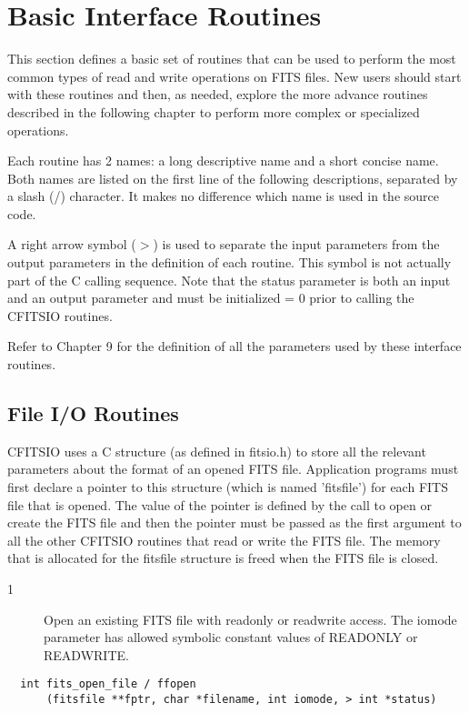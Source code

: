 
\chapter{ Basic Interface Routines }

This section defines a basic set of routines that can be
used to perform the most common types of read and write operations
on FITS files.  New users should start with these routines and
then, as needed, explore the more advance routines described in
the following chapter to perform more complex or specialized operations.

Each routine has 2 names: a long descriptive
name and a short concise name.  Both names are listed on the first
line of the following descriptions, separated by a slash (/) character.
It makes no difference which name is used in the source code.

A right arrow symbol ($>$) is used to separate the input parameters from
the output parameters in the  definition of each routine.  This symbol
is not actually part of the C calling sequence.  Note that
the status parameter is both an input and an output parameter
and must be initialized = 0 prior to calling the CFITSIO routines.

Refer to Chapter 9 for the definition of all the parameters
used by these interface routines.


\section{File I/O Routines}

CFITSIO uses a C structure (as defined in fitsio.h) to store all the
relevant parameters about the format of an opened FITS file.
Application programs must first declare a pointer to this structure
(which is named 'fitsfile') for each FITS file that is opened.  The
value of the pointer is defined by the call to open or create the FITS
file and then the pointer must be passed as the first argument to all
the other CFITSIO routines that read or write the FITS file.  The
memory that is allocated for the fitsfile structure is freed when
the FITS file is closed.


\begin{description}
\item[1 ] Open an existing FITS file with readonly or readwrite access.
    The iomode parameter has allowed symbolic constant values of
   READONLY or READWRITE.
\end{description}

\begin{verbatim}
  int fits_open_file / ffopen
      (fitsfile **fptr, char *filename, int iomode, > int *status)
\end{verbatim}

